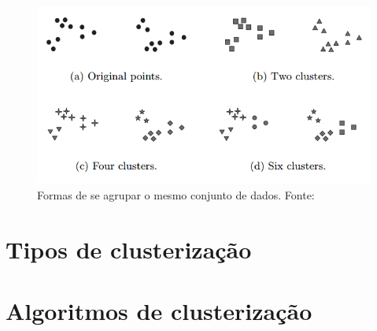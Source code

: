 \begin{figure}[h!]
\centering
\includegraphics[scale=0.4]{figuras/clusters_difficulty.png}
\caption{Formas de se agrupar o mesmo conjunto de dados. Fonte: \cite{tan2013data}}
\label{fig:clusters_difficulty}
\end{figure}

 
\section{Tipos de clusterização}

\section{Algoritmos de clusterização}